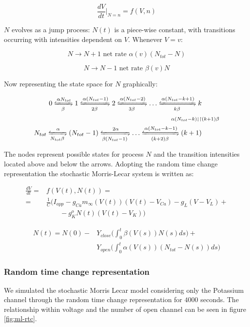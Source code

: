 	$$\frac{dV}{dt}\biggr\vert_{N=n} = f(V, n)$$

	$N$ evolves as a jump process: $N(t)$ is a piece-wise constant, with transitions occurring with intensities dependent on $V$.
	Whenever $V = v$:

	$$N\rightarrow N + 1\text{ net rate } \alpha(v)(N_{tot}-N)$$

	$$N\rightarrow N - 1\text{ net rate } \beta(v)N$$

	Now representing the state space for $N$ graphically:

	\begin{align*}
		0\xleftrightharpoons[\beta]{\alpha N_{tot}} 1 \xleftrightharpoons[2\beta]{\alpha(N_{tot}-1)}2\xleftrightharpoons[3\beta]{\alpha(N_{tot}-2)} \dots \xleftrightharpoons[k\beta]{\alpha(N_{tot}-k+1)}k&\\
		\scriptstyle{\alpha(N_{tot}-k)}\downharpoonleft\upharpoonright&\scriptstyle{(k+1)\beta}\\
		N_{tot}\xleftrightharpoons[N_{tot}\beta]{\alpha}(N_{tot}-1)\xleftrightharpoons[\beta(N_{tot}-1)]{2\alpha}\dots\xleftrightharpoons[(k+2)\beta]{\alpha(N_{tot}-k-1)}(k+1)&
	\end{align*}

The nodes represent possible states for process $N$ and the transition intensities located above and below the arrows.
Adopting the random time change representation the stochastic Morris-Lecar system is written as:

\begin{align*}
	\frac{dV}{dt} =& f(V(t), N(t)) = \\
								=& \frac{1}{C}(I_{app}-g_{Ca}m_\infty(V(t))(V(t)-V_{Ca})-g_L(V-V_L) +\\
								 &\qquad - g_K^oN(t)(V(t)-V_K))
\end{align*}

\begin{align*}
	N(t) = N(0) -&Y_{close}\biggl(\int_0^t\beta(V(s))N(s)ds\biggr) + \\
							 &Y_{open}\biggl(\int_0^t\alpha(V(s))(N_{tot}-N(s))ds\biggr)
\end{align*}

		\subsubsection{Random time change representation}
		We simulated the stochastic Morris Lecar model considering only the Potassium channel through the random time change representation for $4000$ seconds.
		The relationship within voltage and the number of open channel can be seen in figure \ref{fig:ml-rtc}.

